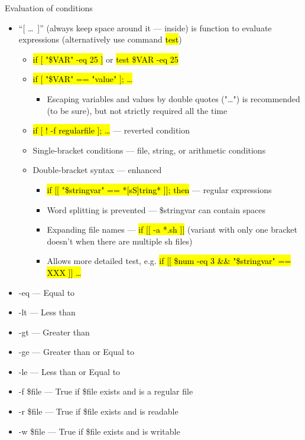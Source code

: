 \documentclass[compress, ucs, xelatex, 11pt, xcolor=svgnames,
  hyperref={
    bookmarks=true,
    unicode=true,
    colorlinks=true,
    pdftitle={Linux, command line and MetaCentrum},
    plainpages=false,
    pdfauthor={Vojtech Zeisek},
    pdfsubject={Course about use of Linux command line, writing shell scripts and using MetaCentrum of CESNET},
    pdfcreator={XeLaTeX, http://www.xelatex.org/},
    pdfkeywords={Linux, GNU, BASH, shell, command line, MetaCentrum},
    linkcolor=Sienna,
    anchorcolor=black,
    citecolor=green,
    filecolor=magenta,
    menucolor=Sienna,
    urlcolor=cyan,
    pdftex},
  url={hyphens, lowtilde} %
  ]{beamer}
\renewcommand{\texttt}[1]{\hl{\ttfamily #1}}
\begin{document}
\begin{frame}[allowframebreaks]{Evaluation of conditions}
\begin{itemize}
  \item ``[ \ldots~]'' (always keep space around it --- inside) is function to evaluate expressions (alternatively use command \texttt{test})
  \begin{itemize}
    \item \texttt{if [ "\$VAR" -eq 25 ]} or \texttt{test \$VAR -eq 25}
    \item \texttt{if [ "\$VAR" == "value" ]; \ldots}
    \begin{itemize}
      \item Escaping variables and values by double quotes ("\ldots") is recommended (to be sure), but not strictly required all the time
    \end{itemize}
    \item \texttt{if [ ! -f regularfile ]; \ldots} --- reverted condition
    \item Single-bracket conditions --- file, string, or arithmetic conditions
    \item Double-bracket syntax --- enhanced
    \begin{itemize}
      \item \texttt{if [[ "\$stringvar" == *[sS]tring* ]]; then} --- regular expressions
      \item Word splitting is prevented --- \$stringvar can contain spaces
      \item Expanding file names --- \texttt{if [[ -a *.sh ]]} (variant with only one bracket doesn't when there are multiple sh files)
      \item Allows more detailed test, e.g. \texttt{if [[ \$num -eq 3 \&\& "\$stringvar" == XXX ]] \ldots}
    \end{itemize}
  \end{itemize}
  \item -eq --- Equal to
  \item -lt --- Less than
  \item -gt --- Greater than
  \item -ge --- Greater than or Equal to
  \item -le --- Less than or Equal to
  \item -f \$file --- True if \$file exists and is a regular file
  \item -r \$file --- True if \$file exists and is readable
  \item -w \$file --- True if \$file exists and is writable

\end{itemize}
\end{frame}
\end{document}

